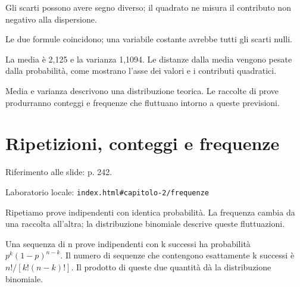 Gli scarti possono avere segno diverso; il quadrato ne misura il contributo non negativo alla dispersione.\par


\label{c2-momenti-example-2-step-5}


Le due formule coincidono; una variabile costante avrebbe tutti gli scarti nulli.\par



La media è 2,125 e la varianza 1,1094. Le distanze dalla media vengono pesate dalla probabilità, come mostrano l'asse dei valori e i contributi quadratici.\par


Media e varianza descrivono una distribuzione teorica. Le raccolte di prove produrranno conteggi e frequenze che fluttuano intorno a queste previsioni.\par


\Needspace{.43\textheight}
\section{Ripetizioni, conteggi e frequenze}
\label{c2-frequenze}

{\sffamily\small\color{Ink!70} Riferimento alle slide: p. 242.\par}

{\sffamily\small\color{Ink!70} Laboratorio locale: \nolinkurl{index.html#capitolo-2/frequenze}\par}

Ripetiamo prove indipendenti con identica probabilità. La frequenza cambia da una raccolta all'altra; la distribuzione binomiale descrive queste fluttuazioni.\par

Una sequenza di n prove indipendenti con k successi ha probabilità \(p^{k}(1- p)^{n- k}\). Il numero di sequenze che contengono esattamente k successi è \(n!/[k!(n- k)!]\). Il prodotto di queste due quantità dà la distribuzione binomiale.\par

